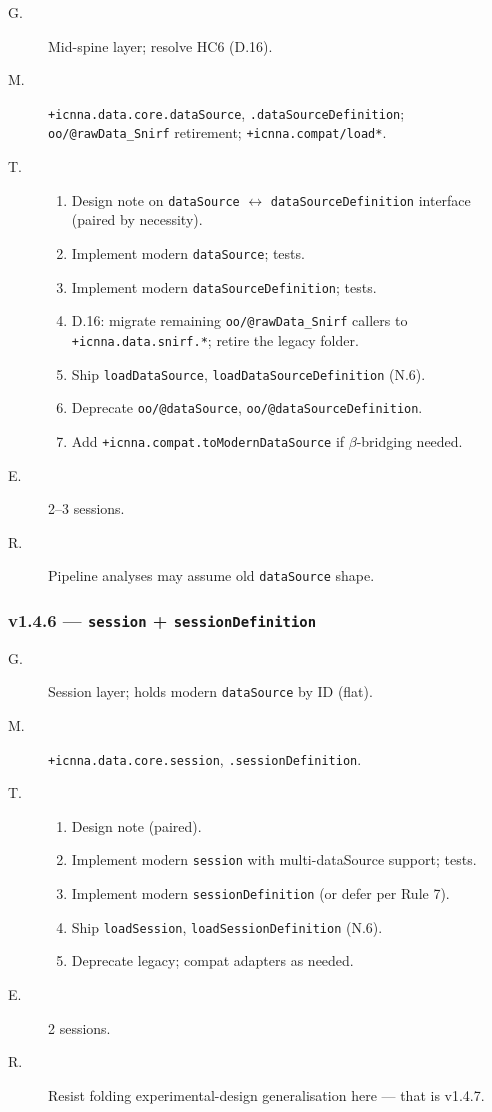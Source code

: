 \documentclass[11pt,a4paper]{article}
\begin{document}
\begin{description}
    \item[G.] Mid-spine layer; resolve HC6 (D.16).
    \item[M.] \texttt{+icnna.data.core.dataSource}, \texttt{.dataSourceDefinition}; \texttt{oo/@rawData\_Snirf} retirement; \texttt{+icnna.compat/load*}.
    \item[T.]
        \begin{enumerate}[nosep]
            \item Design note on \texttt{dataSource} $\leftrightarrow$ \texttt{dataSourceDefinition} interface (paired by necessity).
            \item Implement modern \texttt{dataSource}; tests.
            \item Implement modern \texttt{dataSourceDefinition}; tests.
            \item D.16: migrate remaining \texttt{oo/@rawData\_Snirf} callers to \texttt{+icnna.data.snirf.*}; retire the legacy folder.
            \item Ship \texttt{loadDataSource}, \texttt{loadDataSourceDefinition} (N.6).
            \item Deprecate \texttt{oo/@dataSource}, \texttt{oo/@dataSourceDefinition}.
            \item Add \texttt{+icnna.compat.toModernDataSource} if $\beta$-bridging needed.
        \end{enumerate}
    \item[E.] 2--3 sessions.
    \item[R.] Pipeline analyses may assume old \texttt{dataSource} shape.
\end{description}

\subsubsection*{v1.4.6 --- \texttt{session} + \texttt{sessionDefinition}}

\begin{description}
    \item[G.] Session layer; holds modern \texttt{dataSource} by ID (flat).
    \item[M.] \texttt{+icnna.data.core.session}, \texttt{.sessionDefinition}.
    \item[T.]
        \begin{enumerate}[nosep]
            \item Design note (paired).
            \item Implement modern \texttt{session} with multi-dataSource support; tests.
            \item Implement modern \texttt{sessionDefinition} (or defer per Rule 7).
            \item Ship \texttt{loadSession}, \texttt{loadSessionDefinition} (N.6).
            \item Deprecate legacy; compat adapters as needed.
        \end{enumerate}
    \item[E.] 2 sessions.
    \item[R.] Resist folding experimental-design generalisation here --- that is v1.4.7.
\end{description}
\end{document}
